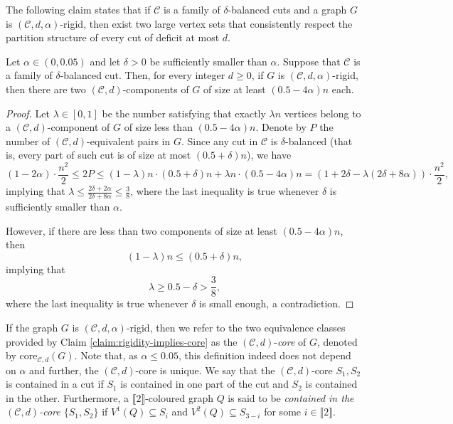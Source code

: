 \documentclass[11pt,a4paper,oneside,reqno]{amsart}
\newcommand{\cC}{\mathcal{C}}
\newcommand{\1}{\mathbbm{1}} %
\newcommand{\br}[1]{\llbracket{#1}\rrbracket}
\renewcommand{\le}{\leqslant}
\renewcommand{\ge}{\geqslant}
\newcommand{\core}{\mathrm{core}}
\begin{document}
The following claim states that if $\cC$ is a family of $\delta$-balanced cuts and a graph $G$ is $(\cC, d, \alpha)$-rigid, then exist two large vertex sets that consistently respect the partition structure of every cut of deficit at most $d$.
\begin{claim}\label{claim:rigidity-implies-core}
    Let $\alpha \in (0,0.05)$ and let $\delta > 0$ be sufficiently smaller than $\alpha$. Suppose that $\cC$ is a family of $\delta$-balanced cut. Then, for every integer $d \ge 0$, if $G$ is $(\cC, d, \alpha)$-rigid, then there are two $(\cC, d)$-components of $G$ of size at least $(0.5 - 4\alpha)n$ each.
\end{claim}
\begin{proof}
    Let $\lambda \in [0, 1]$ be the number satisfying that exactly $\lambda n$ vertices belong to a $(\cC, d)$-component of $G$ of size less than $(0.5 - 4\alpha)n$. Denote by $P$ the number of $(\cC, d)$-equivalent pairs in $G$. Since any cut in $\cC$ is $\delta$-balanced (that is, every part of such cut is of size at most $(0.5 + \delta)n$), we have
    \[
        (1-2\alpha) \cdot \frac{n^2}{2} \le 2P \le (1-\lambda)n \cdot (0.5 + \delta)n + \lambda n \cdot (0.5 - 4\alpha) n = \left(1 + 2\delta - \lambda(2\delta + 8\alpha)\right) \cdot \frac{n^2}{2},
    \]
    implying that
    $\lambda \le \frac{2\delta + 2\alpha}{2\delta + 8\alpha} \le \frac{3}{8}$,
    where the last inequality is true whenever $\delta$ is sufficiently smaller than $\alpha$.

    However, if there are less than two components of size at least $(0.5 - 4\alpha)n$, then
    \[
        (1-\lambda)n \le (0.5+\delta)n,
    \]
    implying that
    \[
        \lambda \ge 0.5 - \delta > \frac{3}{8},
    \]
    where the last inequality is true whenever $\delta$ is small enough, a contradiction.
\end{proof}


If the graph $G$ is $(\cC, d, \alpha)$-rigid, then we refer to the two equivalence classes provided by Claim \ref{claim:rigidity-implies-core} as the $(\cC, d)$-\textit{core} of $G$, denoted by $\core_{\cC, d}(G)$. Note that, as $\alpha \le 0.05$, this definition indeed does not depend on $\alpha$ and further, the $(\cC, d)$-core is unique. We say that the $(\cC, d)$-core $S_1, S_2$ is contained in a cut if $S_1$ is contained in one part of the cut and $S_2$ is contained in the other. Furthermore, a $\br{2}$-coloured graph $Q$ is said to be \textit{contained in the $(\cC, d)$-core $\{S_1, S_2\}$} if $V^1(Q) \subseteq S_i$ and $V^2(Q) \subseteq S_{3-i}$ for some $i \in \br{2}$.
\end{document}

